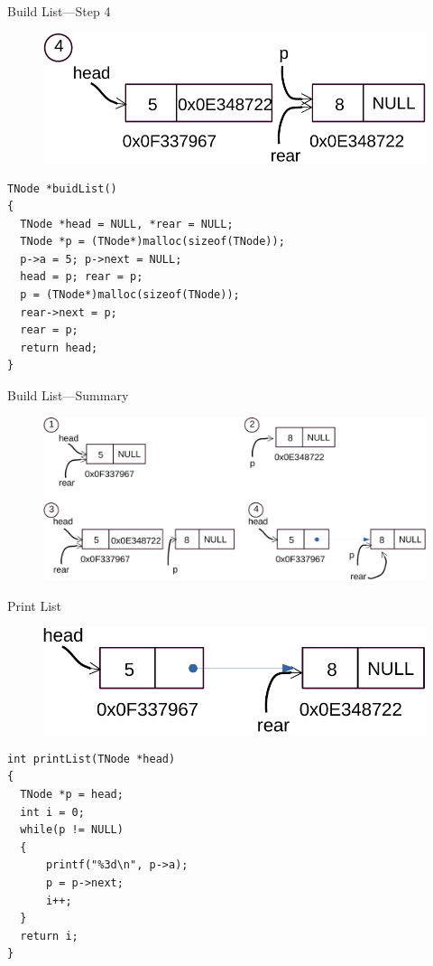 \begin{frame}[fragile]{Build List---Step 4}
\vspace{-0.1in}
\begin{figure}
\begin{center}
	\includegraphics[width=0.5\linewidth]{figs/list_build_step4.pdf}
\end{center}
\end{figure}
\begin{lstlisting}[xleftmargin=0.05\linewidth, linewidth=0.9\linewidth]
TNode *buidList()
{
  TNode *head = NULL, *rear = NULL;
  TNode *p = (TNode*)malloc(sizeof(TNode));
  p->a = 5; p->next = NULL;
  head = p; rear = p;
  p = (TNode*)malloc(sizeof(TNode));
  rear->next = p;
  rear = p;
  return head;
}
\end{lstlisting}
\end{frame}

\begin{frame}[fragile]{Build List---Summary}
\vspace{-0.1in}
\begin{figure}
\begin{center}
	\includegraphics[width=0.85\linewidth]{figs/list_build.pdf}
\end{center}
\end{figure}
\end{frame}

\begin{frame}[fragile]{Print List}
\vspace{-0.1in}
\begin{figure}
\begin{center}
	\includegraphics[width=0.4\linewidth]{figs/list_print.pdf}
\end{center}
\end{figure}
\begin{lstlisting}[xleftmargin=0.05\linewidth, linewidth=0.9\linewidth]
int printList(TNode *head)
{
  TNode *p = head;
  int i = 0;
  while(p != NULL)
  {
      printf("%3d\n", p->a);
      p = p->next;
      i++;
  }
  return i;
}
\end{lstlisting}
\end{frame}

